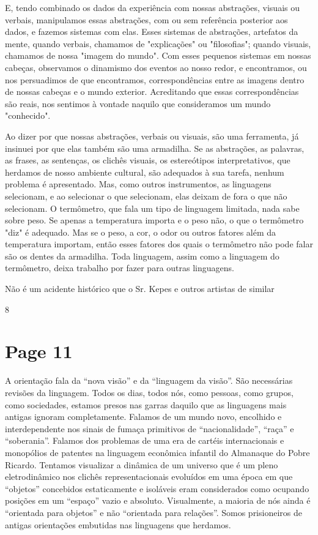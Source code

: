 \documentclass[a4paper]{article}
\begin{document}
E, tendo combinado os dados da experiência com nossas abstrações, visuais ou verbais, manipulamos essas abstrações, com ou sem referência posterior aos dados, e fazemos sistemas com elas. Esses sistemas de abstrações, artefatos da mente, quando verbais, chamamos de "explicações" ou "filosofias"; quando visuais, chamamos de nossa "imagem do mundo".
Com esses pequenos sistemas em nossas cabeças, observamos o dinamismo dos eventos ao nosso redor, e encontramos, ou nos persuadimos de que encontramos, correspondências entre as imagens dentro de nossas cabeças e o mundo exterior. Acreditando que essas correspondências são reais, nos sentimos à vontade naquilo que consideramos um mundo "conhecido".

Ao dizer por que nossas abstrações, verbais ou visuais, são uma ferramenta, já insinuei por que elas também são uma armadilha. Se as abstrações, as palavras, as frases, as sentenças, os clichês visuais, os estereótipos interpretativos, que herdamos de nosso ambiente cultural, são adequados à sua tarefa, nenhum problema é apresentado. Mas, como outros instrumentos, as linguagens selecionam, e ao selecionar o que selecionam, elas deixam de fora o que não selecionam. O termômetro, que fala um tipo de linguagem limitada, nada sabe sobre peso. Se apenas a temperatura importa e o peso não, o que o termômetro "diz" é adequado. Mas se o peso, a cor, o odor ou outros fatores além da temperatura importam, então esses fatores dos quais o termômetro não pode falar são os dentes da armadilha. Toda linguagem, assim como a linguagem do termômetro, deixa trabalho por fazer para outras linguagens.

Não é um acidente histórico que o Sr. Kepes e outros artistas de similar

\vfill
\centerline{8}

\newpage
\section*{Page 11}

A orientação fala da ``nova visão'' e da ``linguagem da visão''. São necessárias revisões da linguagem. Todos os dias, todos nós, como pessoas, como grupos, como sociedades, estamos presos nas garras daquilo que as linguagens mais antigas ignoram completamente. Falamos de um mundo novo, encolhido e interdependente nos sinais de fumaça primitivos de ``nacionalidade'', ``raça'' e ``soberania''. Falamos dos problemas de uma era de cartéis internacionais e monopólios de patentes na linguagem econômica infantil do Almanaque do Pobre Ricardo. Tentamos visualizar a dinâmica de um universo que é um pleno eletrodinâmico nos clichês representacionais evoluídos em uma época em que ``objetos'' concebidos estaticamente e isoláveis eram considerados como ocupando posições em um ``espaço'' vazio e absoluto. Visualmente, a maioria de nós ainda é ``orientada para objetos'' e não ``orientada para relações''. Somos prisioneiros de antigas orientações embutidas nas linguagens que herdamos.
\end{document}
